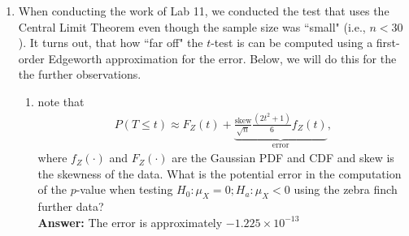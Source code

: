\documentclass{article}\usepackage[]{graphicx}\usepackage[]{xcolor}
\begin{document}
\begin{enumerate}
\item When conducting the work of Lab 11, we conducted the test that uses the
Central Limit Theorem even though the sample size was ``small" (i.e., $n<30$).
It turns out, that how ``far off" the $t$-test is can be computed using
a first-order Edgeworth approximation for the error. Below, we will do this 
for the the further observations.
\begin{enumerate}
  \item \cite{Boos00} note that 
  \begin{align*}
    P(T \leq t) \approx F_Z(t) + \underbrace{\frac{\text{skew}}{\sqrt{n}} \frac{(2t^2+1)}{6} f_Z(t)}_{\textrm{error}},
  \end{align*}
  where $f_Z(\cdot)$ and $F_Z(\cdot)$ are the Gaussian PDF and CDF and skew is the
  skewness of the data. What is the potential error in the computation of the 
  $p$-value when testing $H_0: \mu_X=0; H_a: \mu_X<0$ using the zebra finch further data? \\
  \textbf{Answer:} The error is approximately $-1.225 \times 10^{-13}$
  

\end{enumerate}
\end{enumerate}
\end{document}
